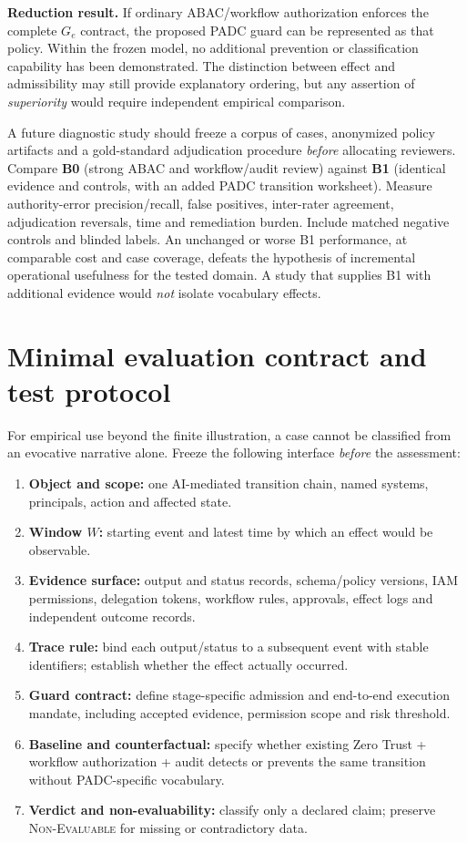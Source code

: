 \documentclass[11pt,a4paper]{article}
\newcommand{\NE}{\textsc{Non-Evaluable}}
\begin{document}
\textbf{Reduction result.} If ordinary ABAC/workflow authorization enforces the complete $G_e$ contract, the proposed PADC guard can be represented as that policy. Within the frozen model, no additional prevention or classification capability has been demonstrated. The distinction between effect and admissibility may still provide explanatory ordering, but any assertion of \emph{superiority} would require independent empirical comparison.

A future diagnostic study should freeze a corpus of cases, anonymized policy artifacts and a gold-standard adjudication procedure \emph{before} allocating reviewers. Compare \textbf{B0} (strong ABAC and workflow/audit review) against \textbf{B1} (identical evidence and controls, with an added PADC transition worksheet). Measure authority-error precision/recall, false positives, inter-rater agreement, adjudication reversals, time and remediation burden. Include matched negative controls and blinded labels. An unchanged or worse B1 performance, at comparable cost and case coverage, defeats the hypothesis of incremental operational usefulness for the tested domain. A study that supplies B1 with additional evidence would \emph{not} isolate vocabulary effects.

\section{Minimal evaluation contract and test protocol}
For empirical use beyond the finite illustration, a case cannot be classified from an evocative narrative alone. Freeze the following interface \emph{before} the assessment:
\begin{enumerate}
\item \textbf{Object and scope:} one AI-mediated transition chain, named systems, principals, action and affected state.
\item \textbf{Window $W$:} starting event and latest time by which an effect would be observable.
\item \textbf{Evidence surface:} output and status records, schema/policy versions, IAM permissions, delegation tokens, workflow rules, approvals, effect logs and independent outcome records.
\item \textbf{Trace rule:} bind each output/status to a subsequent event with stable identifiers; establish whether the effect actually occurred.
\item \textbf{Guard contract:} define stage-specific admission and end-to-end execution mandate, including accepted evidence, permission scope and risk threshold.
\item \textbf{Baseline and counterfactual:} specify whether existing Zero Trust + workflow authorization + audit detects or prevents the same transition without PADC-specific vocabulary.
\item \textbf{Verdict and non-evaluability:} classify only a declared claim; preserve \NE{} for missing or contradictory data.
\end{enumerate}
\end{document}
